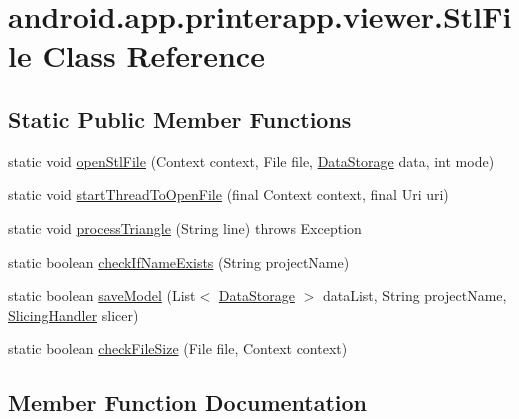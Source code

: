 \hypertarget{classandroid_1_1app_1_1printerapp_1_1viewer_1_1_stl_file}{}\section{android.\+app.\+printerapp.\+viewer.\+Stl\+File Class Reference}
\label{classandroid_1_1app_1_1printerapp_1_1viewer_1_1_stl_file}
\subsection*{Static Public Member Functions}
\begin{DoxyCompactItemize}
\item 
static void \hyperlink{classandroid_1_1app_1_1printerapp_1_1viewer_1_1_stl_file_ab204b81e5ec882a8bf9cdb1d8d603a3f}{open\+Stl\+File} (Context context, File file, \hyperlink{classandroid_1_1app_1_1printerapp_1_1viewer_1_1_data_storage}{Data\+Storage} data, int mode)
\item 
static void \hyperlink{classandroid_1_1app_1_1printerapp_1_1viewer_1_1_stl_file_aafaa1034510d05373e50a6a206099716}{start\+Thread\+To\+Open\+File} (final Context context, final Uri uri)
\item 
static void \hyperlink{classandroid_1_1app_1_1printerapp_1_1viewer_1_1_stl_file_ae15ef8f0538f6689306080ea1ca9432a}{process\+Triangle} (String line)  throws Exception 
\item 
static boolean \hyperlink{classandroid_1_1app_1_1printerapp_1_1viewer_1_1_stl_file_ab0496f58ece4af51edade7b62d53d195}{check\+If\+Name\+Exists} (String project\+Name)
\item 
static boolean \hyperlink{classandroid_1_1app_1_1printerapp_1_1viewer_1_1_stl_file_a1468c9019668fbace543fa43f8a07cdb}{save\+Model} (List$<$ \hyperlink{classandroid_1_1app_1_1printerapp_1_1viewer_1_1_data_storage}{Data\+Storage} $>$ data\+List, String project\+Name, \hyperlink{classandroid_1_1app_1_1printerapp_1_1viewer_1_1_slicing_handler}{Slicing\+Handler} slicer)
\item 
static boolean \hyperlink{classandroid_1_1app_1_1printerapp_1_1viewer_1_1_stl_file_ad12bafd0feb4325596398d999293509a}{check\+File\+Size} (File file, Context context)
\end{DoxyCompactItemize}


\subsection{Member Function Documentation}
\mbox{\label{classandroid_1_1app_1_1printerapp_1_1viewer_1_1_stl_file_ad12bafd0feb4325596398d999293509a}} 
